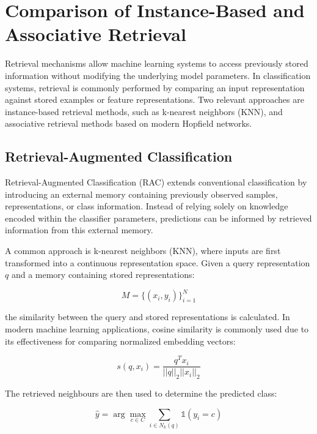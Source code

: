 \section{Comparison of Instance-Based and Associative Retrieval}

Retrieval mechanisms allow machine learning systems to access previously stored information without modifying the underlying model parameters. 
In classification systems, retrieval is commonly performed by comparing an input representation against stored examples or feature representations. 
Two relevant approaches are instance-based retrieval methods, such as k-nearest neighbors (KNN), and associative retrieval methods based on modern Hopfield networks.

\subsection{Retrieval-Augmented Classification}

Retrieval-Augmented Classification (RAC) extends conventional classification by introducing an external memory containing previously observed samples, representations, or class information. 
Instead of relying solely on knowledge encoded within the classifier parameters, predictions can be informed by retrieved information from this external memory.

A common approach is k-nearest neighbors (KNN), where inputs are first transformed into a continuous representation space. 
Given a query representation $q$ and a memory containing stored representations:

\begin{equation}
    M = \{(x_i,y_i)\}_{i=1}^{N}
\end{equation}

the similarity between the query and stored representations is calculated. 
In modern machine learning applications, cosine similarity is commonly used due to its effectiveness for comparing normalized embedding vectors:

\begin{equation}
    s(q,x_i)=\frac{q^Tx_i}{||q||_2||x_i||_2}
\end{equation}

The retrieved neighbours are then used to determine the predicted class:

\begin{equation}
    \hat{y}=
    \arg\max_{c\in C}
    \sum_{i\in N_k(q)}
    \mathbb{1}(y_i=c)
\end{equation}

